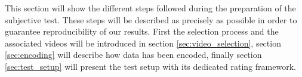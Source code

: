 This section will show the different steps followed during the preparation of the subjective test. These steps will be described as precisely as possible in order to guarantee reproducibility of our results. 
First the selection process and the associated videos will be introduced in section \ref{sec:video_selection}, section \ref{sec:encoding} will describe how data has been encoded, finally section \ref{sec:test_setup} will present the test setup with its dedicated rating framework. 